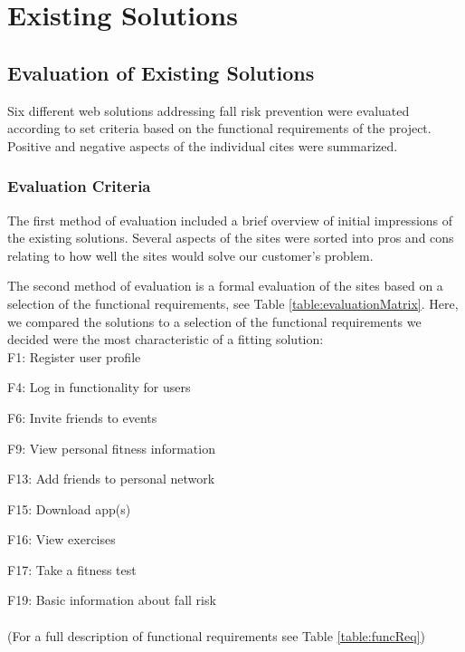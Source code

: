 
\chapter{Existing Solutions}
\section{Evaluation of Existing Solutions}
Six different web solutions addressing fall risk prevention were evaluated according to set criteria based on the functional requirements of the project. Positive and negative aspects of the individual cites were summarized.

\subsection{Evaluation Criteria}
 The first method of evaluation included a brief overview of initial impressions of the existing solutions. Several aspects of the sites were sorted into pros and cons relating to how well the sites would solve our customer's problem.
 
 The second method of evaluation is a formal evaluation of the sites based on a selection of the functional requirements, see Table  \ref{table:evaluationMatrix}. Here, we compared the solutions to a selection of the  functional requirements we decided were the most characteristic of a fitting solution:
\\

F1: Register user profile

F4: Log in functionality for users 

F6: Invite friends to events 

F9: View personal fitness information

F13: Add friends to personal network

F15: Download app(s)

F16: View exercises

F17: Take a fitness test

F19: Basic information about fall risk\\
\\
(For a full description of functional requirements see Table \ref{table:funcReq})

